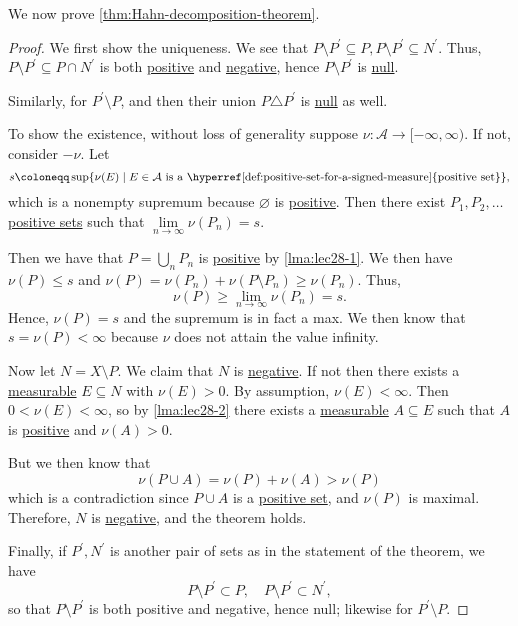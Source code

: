 We now prove \autoref{thm:Hahn-decomposition-theorem}.
\begin{proof}
  We first show the uniqueness. We see that \(P \setminus P^\prime \subseteq P, P \setminus P^\prime  \subseteq N^\prime \). Thus, \(P \setminus P^\prime  \subseteq P \cap N^\prime \)
  is both \hyperref[def:positive-set-for-a-signed-measure]{positive} and \hyperref[def:negative-set-for-a-signed-measure]{negative}, hence \(P \setminus P^\prime\) is \hyperref[def:null-set-for-a-signed-measure]{null}.

  Similarly, for \(P^\prime \setminus P\), and then their union \(P \triangle P^\prime\) is \hyperref[def:null-set-for-a-signed-measure]{null} as well.

  \par To show the existence, without loss of generality suppose \(\nu \colon \mathcal{A} \to [-\infty,\infty)\). If not, consider \(-\nu\). Let
  \[
    s \coloneqq \sup\{\nu(E) \mid E \in \mathcal{A} \text{ is a \hyperref[def:positive-set-for-a-signed-measure]{positive set}}\},
  \]
  which is a nonempty supremum because \(\varnothing\) is \hyperref[def:positive-set-for-a-signed-measure]{positive}. Then there exist
  \(P_1,P_2,\ldots\) \hyperref[def:positive-set-for-a-signed-measure]{positive sets} such that \(\lim\limits_{n\to \infty } \nu(P_n) = s\).

  Then we have that \(P = \bigcup_n P_n\) is \hyperref[def:positive-set-for-a-signed-measure]{positive} by \autoref{lma:lec28-1}.
  We then have \(\nu(P) \leq s\) and \(\nu(P) = \nu(P_n) + \nu(P \setminus P_n) \geq \nu(P_n)\). Thus,
  \[
    \nu(P) \geq \lim_{n \to \infty} \nu(P_n) = s.
  \]
  Hence, \(\nu(P) = s\) and the supremum is in fact a max. We then know that \(s = \nu(P) < \infty\) because \(\nu\) does not attain the value infinity.

  Now let \(N = X \setminus P\). We claim that \(N\) is \hyperref[def:negative-set-for-a-signed-measure]{negative}. If not then there exists a
  \hyperref[def:measurable-set]{measurable} \(E \subseteq N\) with \(\nu(E) > 0\).
  By assumption, \(\nu(E) < \infty\). Then \(0 < \nu(E) < \infty\), so by \autoref{lma:lec28-2} there exists a \hyperref[def:measurable-set]{measurable}
  \(A \subseteq E\) such that \(A\) is \hyperref[def:positive-set-for-a-signed-measure]{positive} and \(\nu(A) > 0\).

  But we then know that
  \[
    \nu(P \cup A) = \nu(P) + \nu(A) > \nu(P)
  \]
  which is a contradiction since \(P \cup A\) is a \hyperref[def:positive-set-for-a-signed-measure]{positive set}, and \(\nu(P)\) is maximal. Therefore,
  \(N\) is \hyperref[def:negative-set-for-a-signed-measure]{negative}, and the theorem holds.

  \par Finally, if \(P^\prime , N^\prime \) is another pair of sets as in the statement of the theorem, we have
  \[
    P\setminus P^\prime \subset P,\quad P\setminus P^\prime \subset N^\prime,
  \]
  so that \(P\setminus P^\prime \) is both positive and negative, hence null; likewise for \(P^\prime \setminus P\).
\end{proof}

